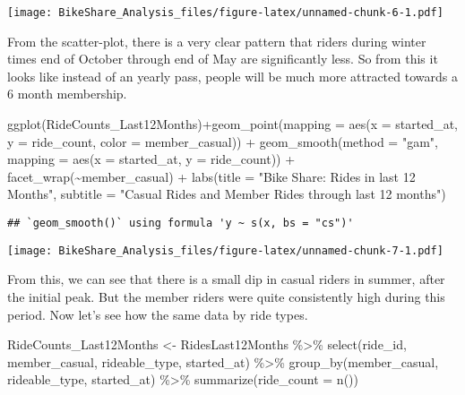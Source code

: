 \documentclass[
]{article}
\newenvironment{Shaded}{\begin{snugshade}}{\end{snugshade}}
\newcommand{\AttributeTok}[1]{\textcolor[rgb]{0.77,0.63,0.00}{#1}}
\newcommand{\FunctionTok}[1]{\textcolor[rgb]{0.00,0.00,0.00}{#1}}
\newcommand{\NormalTok}[1]{#1}
\newcommand{\OtherTok}[1]{\textcolor[rgb]{0.56,0.35,0.01}{#1}}
\newcommand{\SpecialCharTok}[1]{\textcolor[rgb]{0.00,0.00,0.00}{#1}}
\newcommand{\StringTok}[1]{\textcolor[rgb]{0.31,0.60,0.02}{#1}}
\begin{document}
\texttt{[image: BikeShare\_Analysis\_files/figure-latex/unnamed-chunk-6-1.pdf]}

From the scatter-plot, there is a very clear pattern that riders during
winter times end of October through end of May are significantly less.
So from this it looks like instead of an yearly pass, people will be
much more attracted towards a 6 month membership.

\begin{Shaded}
\begin{Highlighting}[]
\FunctionTok{ggplot}\NormalTok{(RideCounts\_Last12Months)}\SpecialCharTok{+}\FunctionTok{geom\_point}\NormalTok{(}\AttributeTok{mapping =} \FunctionTok{aes}\NormalTok{(}\AttributeTok{x =}\NormalTok{ started\_at, }\AttributeTok{y =}\NormalTok{ ride\_count, }\AttributeTok{color =}\NormalTok{ member\_casual)) }\SpecialCharTok{+} \FunctionTok{geom\_smooth}\NormalTok{(}\AttributeTok{method =} \StringTok{"gam"}\NormalTok{, }\AttributeTok{mapping =} \FunctionTok{aes}\NormalTok{(}\AttributeTok{x =}\NormalTok{ started\_at, }\AttributeTok{y =}\NormalTok{ ride\_count)) }\SpecialCharTok{+} \FunctionTok{facet\_wrap}\NormalTok{(}\SpecialCharTok{\textasciitilde{}}\NormalTok{member\_casual) }\SpecialCharTok{+} \FunctionTok{labs}\NormalTok{(}\AttributeTok{title =} \StringTok{"Bike Share: Rides in last 12 Months"}\NormalTok{, }\AttributeTok{subtitle =} \StringTok{"Casual Rides and Member Rides through last 12 months"}\NormalTok{)}
\end{Highlighting}
\end{Shaded}

\begin{verbatim}
## `geom_smooth()` using formula 'y ~ s(x, bs = "cs")'
\end{verbatim}

\texttt{[image: BikeShare\_Analysis\_files/figure-latex/unnamed-chunk-7-1.pdf]}

From this, we can see that there is a small dip in casual riders in
summer, after the initial peak. But the member riders were quite
consistently high during this period. Now let's see how the same data by
ride types.

\begin{Shaded}
\begin{Highlighting}[]
\NormalTok{RideCounts\_Last12Months }\OtherTok{\textless{}{-}}\NormalTok{ RidesLast12Months }\SpecialCharTok{\%\textgreater{}\%}
  \FunctionTok{select}\NormalTok{(ride\_id, member\_casual, rideable\_type, started\_at) }\SpecialCharTok{\%\textgreater{}\%}
  \FunctionTok{group\_by}\NormalTok{(member\_casual, rideable\_type, started\_at) }\SpecialCharTok{\%\textgreater{}\%}
  \FunctionTok{summarize}\NormalTok{(}\AttributeTok{ride\_count =} \FunctionTok{n}\NormalTok{())}
\end{Highlighting}
\end{Shaded}
\end{document}
